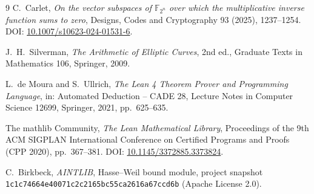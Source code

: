 \documentclass[11pt]{amsart}
\numberwithin{equation}{section}
\theoremstyle{definition}
\theoremstyle{remark}
\begin{document}
\begin{thebibliography}{9}
C.~Carlet, \emph{On the vector subspaces of $\mathbb F_{2^n}$ over which the multiplicative inverse function sums to zero}, Designs, Codes and Cryptography 93 (2025), 1237--1254. DOI: \href{https://doi.org/10.1007/s10623-024-01531-6}{10.1007/s10623-024-01531-6}.

J.~H.~Silverman, \emph{The Arithmetic of Elliptic Curves}, 2nd ed., Graduate Texts in Mathematics 106, Springer, 2009.

L.~de Moura and S.~Ullrich, \emph{The Lean 4 Theorem Prover and Programming Language}, in: Automated Deduction -- CADE 28, Lecture Notes in Computer Science 12699, Springer, 2021, pp.~625--635.

The mathlib Community, \emph{The Lean Mathematical Library}, Proceedings of the 9th ACM SIGPLAN International Conference on Certified Programs and Proofs (CPP 2020), pp.~367--381. DOI: \href{https://doi.org/10.1145/3372885.3373824}{10.1145/3372885.3373824}.

C.~Birkbeck, \emph{AINTLIB}, Hasse--Weil bound module, project snapshot \texttt{1c1c7466\allowbreak 4e40071c\allowbreak 2c2165bc\allowbreak 55ca2616\allowbreak a67ccd6b} (Apache License 2.0).
\end{thebibliography}
\end{document}
